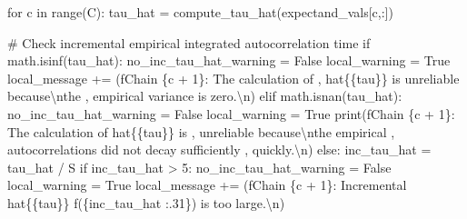 \documentclass[
  letterpaper,
  DIV=11,
  numbers=noendperiod]{scrartcl}
\newenvironment{Shaded}{\begin{snugshade}}{\end{snugshade}}
\newcommand{\BuiltInTok}[1]{\textcolor[rgb]{0.00,0.23,0.31}{#1}}
\newcommand{\CharTok}[1]{\textcolor[rgb]{0.13,0.47,0.30}{#1}}
\newcommand{\CommentTok}[1]{\textcolor[rgb]{0.37,0.37,0.37}{#1}}
\newcommand{\ControlFlowTok}[1]{\textcolor[rgb]{0.00,0.23,0.31}{#1}}
\newcommand{\DecValTok}[1]{\textcolor[rgb]{0.68,0.00,0.00}{#1}}
\newcommand{\KeywordTok}[1]{\textcolor[rgb]{0.00,0.23,0.31}{#1}}
\newcommand{\NormalTok}[1]{\textcolor[rgb]{0.00,0.23,0.31}{#1}}
\newcommand{\OperatorTok}[1]{\textcolor[rgb]{0.37,0.37,0.37}{#1}}
\newcommand{\SpecialCharTok}[1]{\textcolor[rgb]{0.37,0.37,0.37}{#1}}
\newcommand{\SpecialStringTok}[1]{\textcolor[rgb]{0.13,0.47,0.30}{#1}}
\newcommand{\StringTok}[1]{\textcolor[rgb]{0.13,0.47,0.30}{#1}}
\newcommand{\VariableTok}[1]{\textcolor[rgb]{0.07,0.07,0.07}{#1}}
\begin{document}
\begin{Shaded}
\begin{Highlighting}[]
    \ControlFlowTok{for}\NormalTok{ c }\KeywordTok{in} \BuiltInTok{range}\NormalTok{(C):}
\NormalTok{      tau\_hat }\OperatorTok{=}\NormalTok{ compute\_tau\_hat(expectand\_vals[c,:])}

      \CommentTok{\# Check incremental empirical integrated autocorrelation time}
      \ControlFlowTok{if}\NormalTok{ math.isinf(tau\_hat):}
\NormalTok{        no\_inc\_tau\_hat\_warning }\OperatorTok{=} \VariableTok{False}
\NormalTok{        local\_warning }\OperatorTok{=} \VariableTok{True}
\NormalTok{        local\_message }\OperatorTok{+=}\NormalTok{ (}\SpecialStringTok{f\textquotesingle{}Chain }\SpecialCharTok{\{}\NormalTok{c }\OperatorTok{+} \DecValTok{1}\SpecialCharTok{\}}\SpecialStringTok{: The calculation of \textquotesingle{}}\NormalTok{,}
                           \StringTok{\textquotesingle{}hat}\SpecialCharTok{\{\{}\StringTok{tau}\SpecialCharTok{\}\}}\StringTok{ is unreliable because}\CharTok{\textbackslash{}n}\StringTok{the \textquotesingle{}}\NormalTok{,}
                           \StringTok{\textquotesingle{}empirical variance is zero.}\CharTok{\textbackslash{}n}\StringTok{\textquotesingle{}}\NormalTok{)}
      \ControlFlowTok{elif}\NormalTok{ math.isnan(tau\_hat):}
\NormalTok{        no\_inc\_tau\_hat\_warning }\OperatorTok{=} \VariableTok{False}
\NormalTok{        local\_warning }\OperatorTok{=} \VariableTok{True}
        \BuiltInTok{print}\NormalTok{(}\SpecialStringTok{f\textquotesingle{}Chain }\SpecialCharTok{\{}\NormalTok{c }\OperatorTok{+} \DecValTok{1}\SpecialCharTok{\}}\SpecialStringTok{: The calculation of hat}\CharTok{\{\{}\SpecialStringTok{tau}\CharTok{\}\}}\SpecialStringTok{ is \textquotesingle{}}\NormalTok{,}
               \StringTok{\textquotesingle{}unreliable because}\CharTok{\textbackslash{}n}\StringTok{the empirical \textquotesingle{}}\NormalTok{,}
               \StringTok{\textquotesingle{}autocorrelations did not decay sufficiently \textquotesingle{}}\NormalTok{,}
               \StringTok{\textquotesingle{}quickly.}\CharTok{\textbackslash{}n}\StringTok{\textquotesingle{}}\NormalTok{)}
      \ControlFlowTok{else}\NormalTok{:}
\NormalTok{        inc\_tau\_hat }\OperatorTok{=}\NormalTok{ tau\_hat }\OperatorTok{/}\NormalTok{ S}
        \ControlFlowTok{if}\NormalTok{ inc\_tau\_hat }\OperatorTok{\textgreater{}} \DecValTok{5}\NormalTok{:}
\NormalTok{          no\_inc\_tau\_hat\_warning }\OperatorTok{=} \VariableTok{False}
\NormalTok{          local\_warning }\OperatorTok{=} \VariableTok{True}
\NormalTok{          local\_message }\OperatorTok{+=}\NormalTok{ (}\SpecialStringTok{f\textquotesingle{}Chain }\SpecialCharTok{\{}\NormalTok{c }\OperatorTok{+} \DecValTok{1}\SpecialCharTok{\}}\SpecialStringTok{: Incremental hat}\CharTok{\{\{}\SpecialStringTok{tau}\CharTok{\}\}}\SpecialStringTok{ \textquotesingle{}}
                            \SpecialStringTok{f\textquotesingle{}(}\SpecialCharTok{\{}\NormalTok{inc\_tau\_hat }\SpecialCharTok{:.31\}}\SpecialStringTok{) is too large.}\CharTok{\textbackslash{}n}\SpecialStringTok{\textquotesingle{}}\NormalTok{)}


\end{Highlighting}
\end{Shaded}
\end{document}
